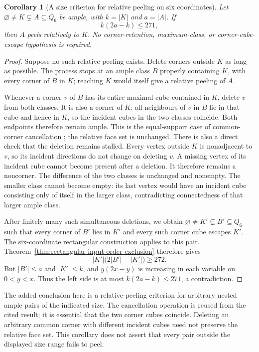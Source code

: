 \documentclass[11pt]{article}
\numberwithin{equation}{section}
\newtheorem{corollary}[theorem]{Corollary}
\theoremstyle{definition}
\theoremstyle{remark}
\begin{document}
\begin{corollary}[A size criterion for relative peeling on six coordinates]
\label{cor:relative-six-weighted-size}
Let $\varnothing\ne K\subsetneq A\subseteq Q_6$ be ample, with
$k=|K|$ and $a=|A|$. If
\[
 k(2a-k)\le271,
\]
then $A$ peels relatively to $K$. No corner-retention, maximum-class,
or corner-cube-escape hypothesis is required.
\end{corollary}
\begin{proof}
Suppose no such relative peeling exists. Delete corners outside $K$
as long as possible. The process stops at an ample class $B$ properly
containing $K$, with every corner of $B$ in $K$; reaching $K$ would
itself give a relative peeling of $A$.

Whenever a corner $v$ of $B$ has its entire maximal cube contained
in $K$, delete $v$ from both classes. It is also a corner of $K$:
all neighbours of $v$ in $B$ lie in that cube and hence in $K$, so
the incident cubes in the two classes coincide. Both endpoints
therefore remain ample. This is the equal-support case of
common-corner cancellation
\cite[Lemma \texttt{relative-common-corner-cancellation}]
{BousquetPartitionability26}; the relative face set is unchanged.
There is also a direct check that the deletion remains stalled.
Every vertex outside $K$ is nonadjacent to $v$, so its incident
directions do not change on deleting $v$. A missing vertex of its
incident cube cannot become present after a deletion. It therefore
remains a noncorner. The difference of the two classes is unchanged
and nonempty. The smaller class cannot become empty: its last vertex
would have an incident cube consisting only of itself in the larger
class, contradicting connectedness of that larger ample class.

After finitely many such simultaneous deletions, we obtain
$\varnothing\ne K'\subsetneq B'\subseteq Q_6$ such that every
corner of $B'$ lies in $K'$ and every such corner cube escapes $K'$.
The six-coordinate rectangular construction applies to this pair.
Theorem~\ref{thm:rectangular-input-order-exclusion} therefore gives
\[
 |K'|\bigl(2|B'|-|K'|\bigr)\ge272.
\]
But $|B'|\le a$ and $|K'|\le k$, and $y(2x-y)$ is increasing in
each variable on $0<y<x$. Thus the left side is at most
$k(2a-k)\le271$, a contradiction.
\end{proof}

The added conclusion here is a relative-peeling criterion for arbitrary
nested ample pairs of the indicated size. The cancellation operation is
reused from the cited result; it is essential that the two corner cubes
coincide. Deleting an arbitrary common corner with different incident
cubes need not preserve the relative face set. This corollary does not
assert that every pair outside the displayed size range fails to peel.
\end{document}
